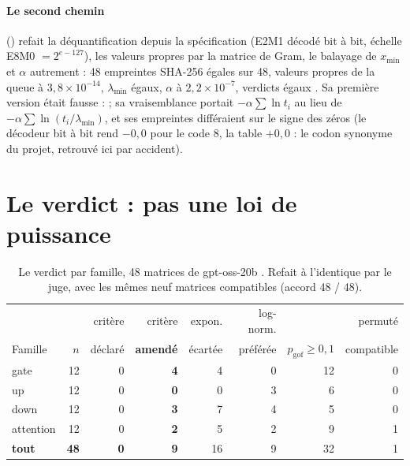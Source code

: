 \paragraph{Le second chemin} () refait la déquantification depuis la spécification (E2M1 décodé bit à bit, échelle E8M0 $= 2^{e - 127}$), les valeurs propres par la matrice de Gram, le balayage de $x_{\min}$ et $\alpha$ autrement : 48 empreintes SHA-256 égales sur 48, valeurs propres de la queue à $3{,}8 \times 10^{-14}$, $\lambda_{\min}$ égaux, $\alpha$ à $2{,}2 \times 10^{-7}$, verdicts égaux \mes. Sa première version était fausse :  ; sa vraisemblance portait $-\alpha\sum\ln t_i$ au lieu de $-\alpha\sum\ln(t_i/\lambda_{\min})$, et ses empreintes différaient sur le signe des zéros (le décodeur bit à bit rend $-0{,}0$ pour le code 8, la table $+0{,}0$ : le codon synonyme du projet, retrouvé ici par accident).

\section{Le verdict : pas une loi de puissance}\label{t3spe:sec:verdict}

\begin{table}[tbp]
\centering\small
\caption[Le verdict par famille]{Le verdict par famille, 48 matrices de gpt-oss-20b \mes. Refait à l'identique par le juge, avec les mêmes neuf matrices compatibles (accord 48 / 48).}
\label{t3spe:tab:verdict}
\setlength{\tabcolsep}{4pt}
\begin{tabular}{@{}lrrrrrrr@{}}
\toprule
& & critère & critère & expon. & log-norm. & & permuté \\
Famille & $n$ & déclaré & \textbf{amendé} & écartée & préférée & $p_{\mathrm{gof}} \ge 0{,}1$ & compatible \\
\midrule
gate & 12 & 0 & \textbf{4} & 4 & 0 & 12 & 0 \\
up & 12 & 0 & \textbf{0} & 0 & 3 & 6 & 0 \\
down & 12 & 0 & \textbf{3} & 7 & 4 & 5 & 0 \\
attention & 12 & 0 & \textbf{2} & 5 & 2 & 9 & 1 \\
\midrule
\textbf{tout} & \textbf{48} & \textbf{0} & \textbf{9} & 16 & 9 & 32 & 1 \\
\bottomrule
\end{tabular}
\end{table}

